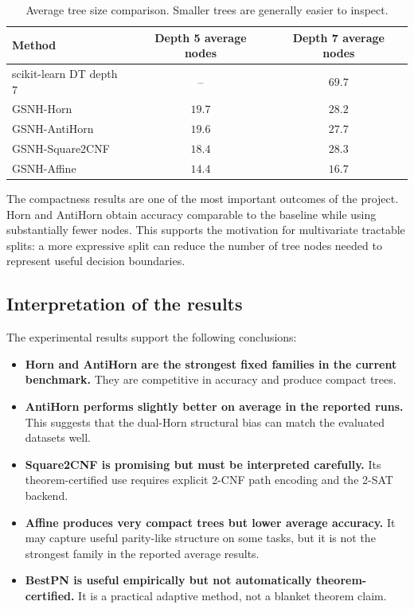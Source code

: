 \documentclass[11pt,a4paper]{article}
\begin{document}
\begin{table}[h]
\centering
\caption{Average tree size comparison. Smaller trees are generally easier to inspect.}
\label{tab:size}
\begin{tabular}{lcc}
\toprule
Method & Depth 5 average nodes & Depth 7 average nodes \\
\midrule
scikit-learn DT depth 7 & -- & $69.7$ \\
GSNH-Horn & $19.7$ & $28.2$ \\
GSNH-AntiHorn & $19.6$ & $27.7$ \\
GSNH-Square2CNF & $18.4$ & $28.3$ \\
GSNH-Affine & $14.4$ & $16.7$ \\
\bottomrule
\end{tabular}
\end{table}

The compactness results are one of the most important outcomes of the project. Horn and AntiHorn obtain accuracy comparable to the baseline while using substantially fewer nodes. This supports the motivation for multivariate tractable splits: a more expressive split can reduce the number of tree nodes needed to represent useful decision boundaries.

\subsection{Interpretation of the results}

The experimental results support the following conclusions:
\begin{itemize}
    \item \textbf{Horn and AntiHorn are the strongest fixed families in the current benchmark.} They are competitive in accuracy and produce compact trees.
    \item \textbf{AntiHorn performs slightly better on average in the reported runs.} This suggests that the dual-Horn structural bias can match the evaluated datasets well.
    \item \textbf{Square2CNF is promising but must be interpreted carefully.} Its theorem-certified use requires explicit 2-CNF path encoding and the 2-SAT backend.
    \item \textbf{Affine produces very compact trees but lower average accuracy.} It may capture useful parity-like structure on some tasks, but it is not the strongest family in the reported average results.
    \item \textbf{BestPN is useful empirically but not automatically theorem-certified.} It is a practical adaptive method, not a blanket theorem claim.
\end{itemize}
\end{document}
